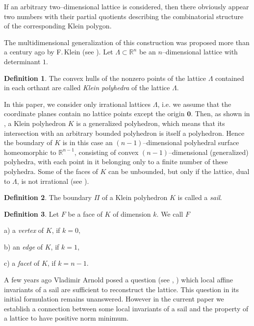 \documentclass[11pt]{article}
\theoremstyle{definition}
\newtheorem{definition}{Definition}
\theoremstyle{remark}
\theoremstyle{plain}
\renewcommand{\vec}[1]{\mathbf{#1}}
\newcommand{\sail}{\Pi}
\newcommand{\La}{\Lambda}
\newcommand{\R}{\mathbb{R}}
\begin{document}
  If an arbitrary two--dimensional lattice is considered, then there obviously appear two
  numbers with their partial quotients describing the combinatorial structure of the
  corresponding Klein polygon.

  The multidimensional generalization of this construction was proposed more than a century
  ago by F.\,Klein (see \cite{klein}). Let $\La\subset\R^n$ be an $n$--dimensional lattice
  with determinant $1$.

  \begin{definition}
    The convex hulls of the nonzero points of the lattice $\La$ contained in each orthant are
    called \emph{Klein polyhedra} of the lattice $\La$.
  \end{definition}

  In this paper, we consider only irrational lattices $\La$, i.e. we assume that the
  coordinate planes contain no lattice points except the origin $\vec 0$. Then, as shown
  in \cite{moussafir_A_polyhedra}, a Klein polyhedron $K$ is a generalized polyhedron, which
  means that its intersection with an arbitrary bounded polyhedron is itself a polyhedron.
  Hence the boundary of $K$ is in this case an $(n-1)$--dimensional polyhedral surface
  homeomorphic to $\R^{n-1}$, consisting of convex $(n-1)$--dimensional (generalized)
  polyhedra, with each point in it belonging only to a finite number of these polyhedra. Some
  of the faces of $K$ can be unbounded, but only if the lattice, dual to $\La$, is not
  irrational (see \cite{german_norm_minima_I}).

  \begin{definition}
    The boundary $\sail$ of a Klein polyhedron $K$ is called a \emph{sail}.
  \end{definition}

  \begin{definition}
    Let $F$ be a face of $K$ of dimension $k$. We call $F$

    a) a \emph{vertex} of $K$, if $k=0$,

    b) an \emph{edge} of $K$, if $k=1$,

    c) a \emph{facet} of $K$, if $k=n-1$.
  \end{definition}

  A few years ago Vladimir Arnold posed a question (see \cite{arnold_mccme},
  \cite{arnold_preface}) which local affine invariants of a sail are sufficient to
  reconstruct the lattice. This question in its initial formulation remains unanswered.
  However in the current paper we establish a connection between some local invariants of a
  sail and the property of a lattice to have positive norm minimum.
\end{document}
